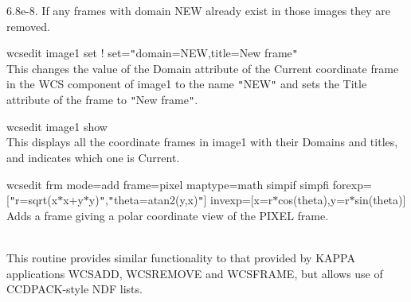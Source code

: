 \documentclass[twoside,11pt]{article}
\newcommand{\xref}[3]{#1}
\renewcommand{\_}{\texttt{\symbol{95}}}
\newcommand{\sstexamplesubsection}[2]{\sloppy \item{\ssttt #1} \mbox{} \\ #2 }
\newcommand{\sstnotes}[1]{\item[Notes:] \mbox{} \\[1.3ex] #1}
\newcommand{\sstitem}{\item}
\newcommand{\sstexamplesubsection}[2]{\item[{\ssttt #1}] #2}
\newcommand{\sstnotes}[1]{\item[Notes:] #1 }
\newcommand{\sstitem}{\item}
\begin{document}
{{{{            \sstitem
            6.8e-8.  If any frames with domain NEW already exist in
            those images they are removed.
         }
      }
      \sstexamplesubsection{
         wcsedit image1 set ! set={\tt "}domain=NEW,title=New frame{\tt "}
      }{
         This changes the value of the Domain attribute of the Current
         coordinate frame in the WCS component of image1 to the name
         {\tt "}NEW{\tt "} and  sets the Title attribute of the frame to {\tt "}New
         frame{\tt "}.
      }
      \sstexamplesubsection{
         wcsedit image1 show
      }{
         This displays all the coordinate frames in image1 with their
         Domains and titles, and indicates which one is Current.
      }
      \sstexamplesubsection{
         wcsedit frm mode=add frame=pixel maptype=math simpif simpfi
              forexp=[{\tt "}r=sqrt(x$*$x$+$y$*$y){\tt "},{\tt "}theta=atan2(y,x){\tt "}]
              invexp=[x=r$*$cos(theta),y=r$*$sin(theta)]
      }{
         Adds a frame giving a polar coordinate view of the PIXEL frame.
      }
   }
   \sstnotes{
      This routine provides similar functionality to that provided by
      \xref{KAPPA}{sun95}{} applications 
      \xref{WCSADD}{sun95}{WCSADD}, 
      \xref{WCSREMOVE}{sun95}{WCSREMOVE} and 
      \xref{WCSFRAME}{sun95}{WCSFRAME}, but allows
      use of CCDPACK-style NDF lists.
   }
}
\end{document}
